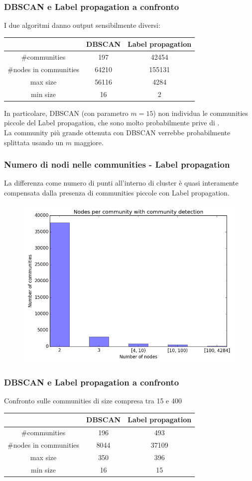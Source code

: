 \documentclass{beamer}
\begin{document}
\begin{frame}
 \frametitle{DBSCAN e Label propagation a confronto}
 I due algoritmi danno output sensibilmente diversi:
 \begin{center}
  \begin{tabular}{||c|c|c||}
\hline
 & DBSCAN & Label propagation \\ 
\hline
#communities & 197 & 42454 \\
\hline
#nodes in communities & 64210 & 155131 \\
\hline
max size & 56116 & 4284 \\
\hline
min size & 16 & 2 \\
\hline
\end{tabular}
\end{center}
In particolare, DBSCAN (con parametro $m = 15$) non individua le communities piccole del Label propagation, che sono molto probabilmente prive di .\\
La community più grande ottenuta con DBSCAN verrebbe probabilmente splittata usando un $m$ maggiore.
\end{frame}
\begin{frame}
 \frametitle{Numero di nodi nelle communities - Label propagation}
 La differenza come numero di punti all'interno di cluster è quasi interamente compensata dalla presenza di communities piccole con Label propagation.
  \begin{figure}[htbp]
\centering
\includegraphics[height=6.0 cm,width=10 cm]{plot_net_nnodes.png}

\end{figure}
\end{frame}
\begin{frame}
\frametitle{DBSCAN e Label propagation a confronto}
Confronto sulle communities di size compresa tra 15 e 400
\begin{center}
  \begin{tabular}{||c|c|c||}
\hline
 & DBSCAN & Label propagation \\ 
\hline
#communities & 196 & 493 \\
\hline
#nodes in communities & 8044 & 37109 \\
\hline
max size & 350 & 396 \\
\hline
min size & 16 & 15 \\
\hline
\end{tabular}
\end{center}
\end{frame}
\end{document}
